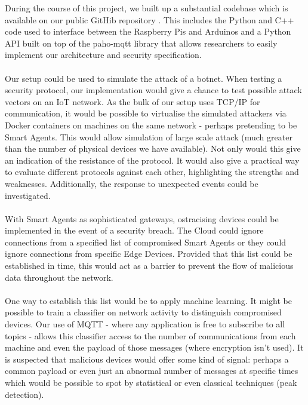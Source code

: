 During the course of this project, we built up a substantial codebase which is available on our public GitHib repository \cite{githubrepo}. This includes the Python and C++ code used to interface between the Raspberry Pis and Arduinos and a Python API built on top of the paho-mqtt library that allows researchers to easily implement our architecture and security specification.

\paragraph{}
Our setup could be used to simulate the attack of a botnet. When testing a security protocol, our implementation would give a chance to test possible attack vectors on an IoT network. As the bulk of our setup uses TCP/IP for communication, it would be possible to virtualise the simulated attackers via Docker containers on machines on the same network - perhaps pretending to be Smart Agents. This would allow simulation of large scale attack (much greater than the number of physical devices we have available). Not only would this give an indication of the resistance of the protocol. It would also give a practical way to evaluate different protocols against each other, highlighting the strengths and weaknesses. Additionally, the response to unexpected events could be investigated.

\paragraph{}
With Smart Agents as sophisticated gateways, ostracising devices could be implemented in the event of a security breach. The Cloud could ignore connections from a specified list of compromised Smart Agents or they could ignore connections from specific Edge Devices. Provided that this list could be established in time, this would act as a barrier to prevent the flow of malicious data throughout the network.

\paragraph{}
One way to establish this list would be to apply machine learning. It might be possible to train a classifier on network activity to distinguish compromised devices. Our use of MQTT - where any application is free to subscribe to all topics - allows this classifier access to the number of communications from each machine and even the payload of those messages (where encryption isn't used). It is suspected that malicious devices would offer some kind of signal: perhaps a common payload or even just an abnormal number of messages at specific times which would be possible to spot by statistical or even classical techniques (peak detection).

